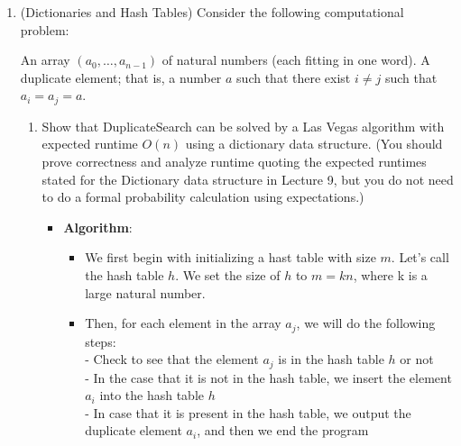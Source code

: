 \documentclass[11pt]{article}
\begin{document}
\begin{enumerate}
\begin{enumerate}
    \end{enumerate}


    \item (Dictionaries and Hash Tables) 
    Consider the following computational problem:
    
{An array $(a_0,\ldots,a_{n-1})$ of natural numbers (each fitting in one word).}
{A duplicate element; that is, a number $a$ such that there exist $i \neq j$ such that $a_i = a_j = a$.}
\begin{enumerate}
    \item Show that DuplicateSearch can be solved by a Las Vegas algorithm with expected runtime $O(n)$ using a dictionary data structure.  (You should prove correctness and analyze runtime quoting the expected runtimes stated for the Dictionary data structure in Lecture 9, but you do not need to do a formal probability calculation using expectations.)  
    \begin{itemize}
        \item \textbf{Algorithm}: 
        \begin{itemize}
            \item We first begin with initializing a hast table with size $m$. Let's call the hash table $h$. We set the size of $h$ to $m = kn$, where k is a large natural number.
            \item Then, for each element in the array $a_j$, we will do the following steps:
            \\ - Check to see that the element $a_j$ is in the hash table $h$ or not
            \\ - In the case that it is not in the hash table, we insert the element $a_i$ into the hash table $h$
            \\ - In case that it is present in the hash table, we output the duplicate element $a_i$, and then we end the program
        \end{itemize}


\end{itemize}
\end{enumerate}
\end{enumerate}
\end{document}
